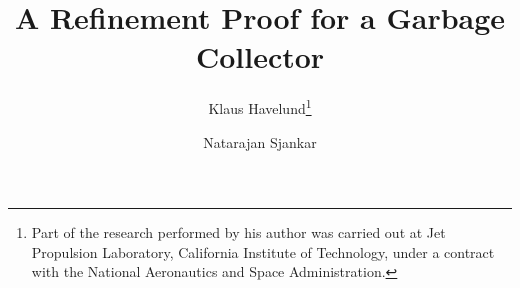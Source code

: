 \documentclass{llncs}
\begin{document}
\title{A Refinement Proof for a Garbage Collector}

\author{ 
Klaus Havelund\thanks{Part of the research performed by 
his author was carried out at Jet Propulsion Laboratory, California 
Institute of Technology, under a contract with the National Aeronautics 
and Space Administration.}
\and
Natarajan Sjankar
}





\maketitle













\appendix


\end{document}
